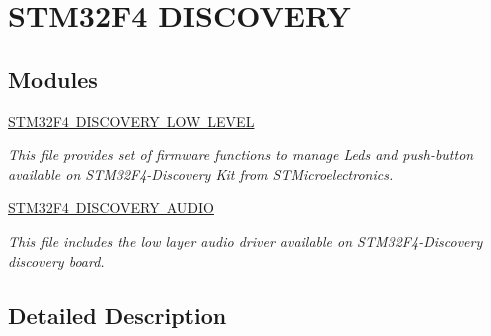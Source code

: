 \hypertarget{group___s_t_m32_f4___d_i_s_c_o_v_e_r_y}{}\section{S\+T\+M32\+F4 D\+I\+S\+C\+O\+V\+E\+RY}
\label{group___s_t_m32_f4___d_i_s_c_o_v_e_r_y}
\subsection*{Modules}
\begin{DoxyCompactItemize}
\item 
\mbox{\hyperlink{group___s_t_m32_f4___d_i_s_c_o_v_e_r_y___l_o_w___l_e_v_e_l}{S\+T\+M32\+F4 D\+I\+S\+C\+O\+V\+E\+R\+Y L\+O\+W L\+E\+V\+EL}}
\begin{DoxyCompactList}\small\item\em This file provides set of firmware functions to manage Leds and push-\/button available on S\+T\+M32\+F4-\/\+Discovery Kit from S\+T\+Microelectronics. \end{DoxyCompactList}\item 
\mbox{\hyperlink{group___s_t_m32_f4___d_i_s_c_o_v_e_r_y___a_u_d_i_o}{S\+T\+M32\+F4 D\+I\+S\+C\+O\+V\+E\+R\+Y A\+U\+D\+IO}}
\begin{DoxyCompactList}\small\item\em This file includes the low layer audio driver available on S\+T\+M32\+F4-\/\+Discovery discovery board. \end{DoxyCompactList}\end{DoxyCompactItemize}


\subsection{Detailed Description}
